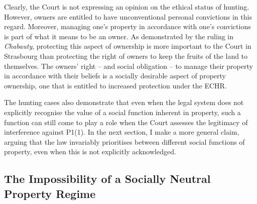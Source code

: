 Clearly, the Court is not expressing an opinion on the ethical status of hunting. However, owners are entitled to have unconventional personal convictions in this regard. Moreover, managing one's property in accordance with one's convictions is part of what it means to be an owner. As demonstrated by the ruling in {\it Chabauty}, protecting this aspect of ownership is more important to the Court in Strasbourg than protecting the right of owners to keep the fruits of the land to themselves. The owners' right -- and social obligation -- to manage their property in accordance with their beliefs is a socially desirable aspect of property ownership, one that is entitled to increased protection under the ECHR. 


The hunting cases also demonstrate that even when the legal system does not explicitly recognise the value of a social function inherent in property, such a function can still come to play a role when the Court assesses the legitimacy of interference against P1(1). In the next section, I make a more general claim, arguing that the law invariably prioritises between different social functions of property, even when this is not explicitly acknowledged.

\subsection{The Impossibility of a Socially Neutral Property Regime}

